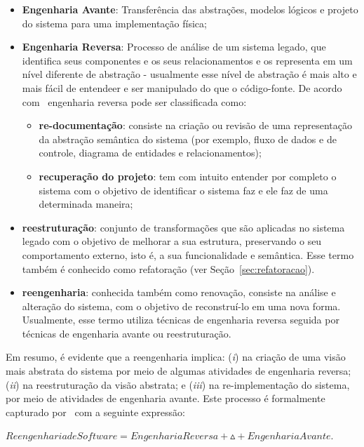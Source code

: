 \begin{itemize}
\item \textbf{Engenharia Avante}: Transferência das abstrações, modelos lógicos e projeto do sistema para uma implementação física;
\item \textbf{Engenharia Reversa}: Processo de análise de um sistema legado, que identifica seus componentes e os seus relacionamentos e os representa em um nível diferente de abstração - usualmente esse nível de abstração é mais alto e mais fácil de entendeer e ser manipulado do que o código-fonte. De acordo com~ engenharia reversa pode ser classificada como:  
    \begin{itemize}
        \item \textbf{re-documentação}: consiste na criação ou revisão de uma representação da abstração semântica do sistema (por exemplo, fluxo de dados e de controle, diagrama de entidades e relacionamentos);
        \item \textbf{recuperação do projeto}: tem com intuito entender por completo o sistema com o objetivo de identificar  o sistema faz e  ele faz de uma determinada maneira;
    \end{itemize}
    \item \textbf{reestruturação}: conjunto de transformações que são aplicadas no sistema legado com o objetivo de melhorar a sua estrutura, preservando o seu comportamento externo, isto é, a sua funcionalidade e semântica. Esse termo também é conhecido como refatoração (ver Seção~\ref{sec:refatoracao}).
    \item \textbf{reengenharia}: conhecida também como renovação, consiste na análise e alteração do sistema, com o objetivo de reconstruí-lo em uma nova forma. Usualmente, esse termo utiliza técnicas de engenharia reversa seguida por técnicas de engenharia avante ou reestruturação.
\end{itemize}

Em resumo, é evidente que a reengenharia implica: (\textit{i}) na criação de uma visão mais abstrata do sistema por meio de algumas atividades de engenharia reversa; (\textit{ii}) na reestruturação da visão abstrata; e (\textit{iii}) na re-implementação do sistema, por meio de atividades de engenharia avante. Este processo é formalmente capturado por~ com a seguinte expressão:

$Reengenharia de Software = Engenharia Reversa + \vartriangle + Engenharia Avante.$

